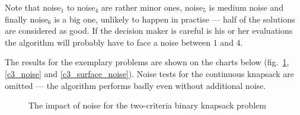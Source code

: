 Note that noise$_1$ to noise$_4$ are rather minor ones, noise$_5$ is medium
noise and finally noise$_6$ is a big one, unlikely to happen in practise ---
half of the solutions are considered as good. If the decision maker is careful
is his or her evaluations the algorithm will probably have to face a noise
between $1$ and $4$.

The results for the exemplary problems are shown on the charts below
(fig.~\ref{c2_noise}, \ref{c3_noise} and \ref{c3_surface_noise}). Noise tests
for the continuous knapsack are omitted --- the algorithm performs badly even
without additional noise.

\begin{figure}
  \centering
  \caption{The impact of noise for the two-criteria binary knapsack problem}
  \label{c2_noise}
\end{figure}

